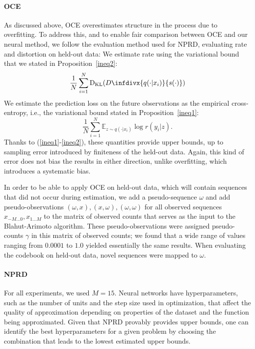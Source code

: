 \documentclass[11pt,letterpaper]{article}
\newcommand{\E}[0]{\mathbb{E}}
\newif \ifcomment
\newcommand\rljf[1]{\ifcomment{{\color{blue}(#1)}}\else{}\fi}
\newcommand{\infdiv}{D\infdivx}
\begin{document}
\paragraph{OCE}
As discussed above, OCE overestimates structure in the process due to overfitting.
To address this, and to enable fair comparison between OCE and our neural method, we follow the evaluation method used for NPRD, evaluating rate and distortion on held-out data:
\rljf{Describe these in prose too and what they mean}
We estimate rate using the variational bound that we stated in Proposition~\ref{ineq2}:
\begin{equation}
\frac{1}{N} \sum_{i=1}^N \operatorname{D_{KL}}(\infdiv{q(\cdot|x_i)}{s(\cdot)})
\end{equation}
We estimate the prediction loss on the future observations as the empirical cross-entropy, i.e., the variational bound stated in Proposition~\ref{ineq1}:
\begin{equation}
\frac{1}{N} \sum_{i=1}^N \E_{z \sim q(\cdot|x_i)} \log r(y_i|z).
\end{equation}
Thanks to (\ref{ineq1}-\ref{ineq2}), these quantities provide upper bounds, up to sampling error introduced by finiteness of the held-out data.
Again, this kind of error does not bias the results in either direction, unlike overfitting, which introduces a systematic bias.


In order to be able to apply OCE on held-out data, which will contain sequences that did not occur during estimation, we add a pseudo-sequence $\omega$ and add pseudo-observations $(\omega, x), (x, \omega), (\omega, \omega)$ for all observed sequences $x_{-M...0}, x_{1...M}$ to the matrix of observed counts that serves as the input to the Blahut-Arimoto algorithm.
These pseudo-observations were assigned pseudo-counts $\gamma$ in this matrix of observed counts; we found that a wide range of values ranging from $0.0001$ to $1.0$ yielded essentially the same results.
When evaluating the codebook on held-out data, novel sequences were mapped to $\omega$.


\paragraph{NPRD}
For all experiments, we used $M=15$.
Neural networks have hyperparameters, such as the number of units and the step size used in optimization, that affect the quality of approximation depending on properties of the dataset and the function being approximated.
Given that NPRD provably provides upper bounds, one can identify the best hyperparameters for a given problem by choosing the combination that leads to the lowest estimated upper bounds.
\end{document}
